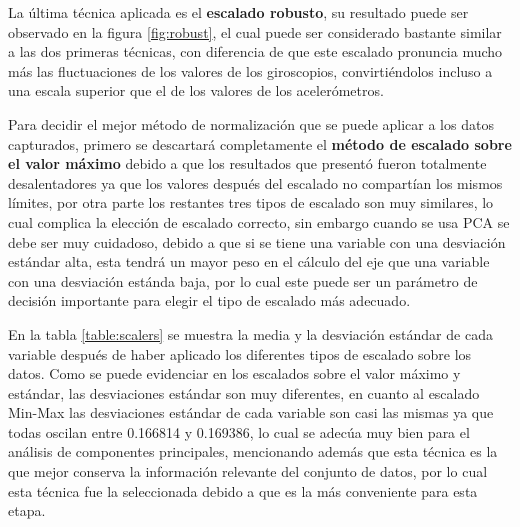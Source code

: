 La \'{u}ltima t\'{e}cnica aplicada es el \textbf{escalado robusto}, su resultado puede ser observado en la figura \ref{fig:robust}, el cual puede ser considerado bastante similar a las dos primeras t\'{e}cnicas, con diferencia de que este escalado pronuncia mucho m\'{a}s las fluctuaciones de los valores de los giroscopios, convirti\'{e}ndolos incluso a una escala superior que el de los valores de los aceler\'{o}metros.

\vspace{5mm} %

Para decidir el mejor m\'{e}todo de normalizaci\'{o}n que se puede aplicar a los datos capturados, primero se descartar\'{a} completamente el \textbf{m\'{e}todo de escalado sobre el valor m\'{a}ximo} debido a que los resultados que present\'{o} fueron totalmente desalentadores ya que los valores despu\'{e}s del escalado no compart\'{i}an los mismos l\'{i}mites, por otra parte los restantes tres tipos de escalado son muy similares, lo cual complica la elecci\'{o}n de escalado correcto, sin embargo cuando se usa PCA se debe ser muy cuidadoso, debido a que si se tiene una variable con una desviaci\'{o}n est\'{a}ndar alta, esta tendr\'{a} un mayor peso en el c\'{a}lculo del eje que una variable con una desviaci\'{o}n est\'{a}nda baja, por lo cual este puede ser un par\'{a}metro de decisi\'{o}n importante para elegir el tipo de escalado m\'{a}s adecuado.

\vspace{5mm} %

En la tabla \ref{table:scalers} se muestra la media y la desviaci\'{o}n est\'{a}ndar de cada variable despu\'{e}s de haber aplicado los diferentes tipos de escalado sobre los datos. Como se puede evidenciar en los escalados sobre el valor m\'{a}ximo y est\'{a}ndar, las desviaciones est\'{a}ndar son muy diferentes, en cuanto al escalado Min-Max las desviaciones est\'{a}ndar de cada variable son casi las mismas ya que todas oscilan entre 0.166814 y 0.169386, lo cual se adec\'{u}a muy bien para el an\'{a}lisis de componentes principales, mencionando adem\'{a}s que esta t\'{e}cnica es la que mejor conserva la informaci\'{o}n relevante del conjunto de datos, por lo cual esta t\'{e}cnica fue la seleccionada debido a que es la m\'{a}s conveniente para esta etapa.

